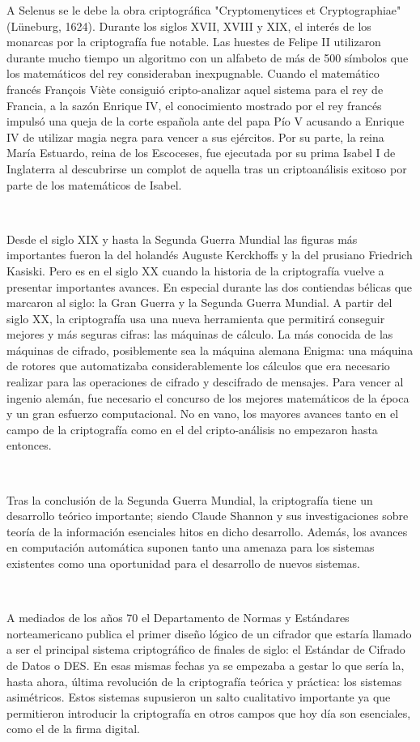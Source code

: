 \documentclass[11pt, conference]{IEEEtran}
\begin{document}
A Selenus se le debe la obra criptográfica "Cryptomenytices et Cryptographiae" (Lüneburg, 1624). Durante los siglos XVII, XVIII y XIX, el interés de los monarcas por la criptografía fue notable. Las huestes de Felipe II utilizaron durante mucho tiempo un algoritmo con un alfabeto de más de 500 símbolos que los matemáticos del rey consideraban inexpugnable. Cuando el matemático francés François Viète consiguió cripto-analizar aquel sistema para el rey de Francia, a la sazón Enrique IV, el conocimiento mostrado por el rey francés impulsó una queja de la corte española ante del papa Pío V acusando a Enrique IV de utilizar magia negra para vencer a sus ejércitos. Por su parte, la reina María Estuardo, reina de los Escoceses, fue ejecutada por su prima Isabel I de Inglaterra al descubrirse un complot de aquella tras un criptoanálisis exitoso por parte de los matemáticos de Isabel. 

\

Desde el siglo XIX y hasta la Segunda Guerra Mundial las figuras más importantes fueron la del holandés Auguste Kerckhoffs y la del prusiano Friedrich Kasiski. Pero es en el siglo XX cuando la historia de la criptografía vuelve a presentar importantes avances. En especial durante las dos contiendas bélicas que marcaron al siglo: la Gran Guerra y la Segunda Guerra Mundial. A partir del siglo XX, la criptografía usa una nueva herramienta que permitirá conseguir mejores y más seguras cifras: las máquinas de cálculo. La más conocida de las máquinas de cifrado, posiblemente sea la máquina alemana Enigma: una máquina de rotores que automatizaba considerablemente los cálculos que era necesario realizar para las operaciones de cifrado y descifrado de mensajes. Para vencer al ingenio alemán, fue necesario el concurso de los mejores matemáticos de la época y un gran esfuerzo computacional. No en vano, los mayores avances tanto en el campo de la criptografía como en el del cripto-análisis no empezaron hasta entonces. 

\

Tras la conclusión de la Segunda Guerra Mundial, la criptografía tiene un desarrollo teórico importante; siendo Claude Shannon y sus investigaciones sobre teoría de la información esenciales hitos en dicho desarrollo. Además, los avances en computación automática suponen tanto una amenaza para los sistemas existentes como una oportunidad para el desarrollo de nuevos sistemas.

\

A mediados de los años 70 el Departamento de Normas y Estándares norteamericano publica el primer diseño lógico de un cifrador que estaría llamado a ser el principal sistema criptográfico de finales de siglo: el Estándar de Cifrado de Datos o DES. En esas mismas fechas ya se empezaba a gestar lo que sería la, hasta ahora, última revolución de la criptografía teórica y práctica: los sistemas asimétricos. Estos sistemas supusieron un salto cualitativo importante ya que permitieron introducir la criptografía en otros campos que hoy día son esenciales, como el de la firma digital.
\end{document}
